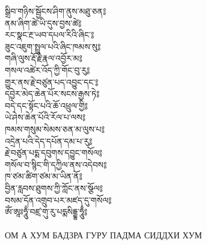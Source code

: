 {སྒྲིབ་གཉིས་སྦྱོངས་ཤིག་ནུས་མཐུ་ཅན༔\\
ནམ་ཞིག་ཚེ་ཡི་དུས་བྱས་ཚེ༔\\
རང་སྣང་རྔ་ཡབ་དཔལ་རིའི་ཞིང་༔\\
ཟུང་འཇུག་སྤྲུལ་པའི་ཞིང་ཁམས་སུ༔\\
གཞི་ལུས་རྡོ་རྗེ་རྣལ་འབྱོར་མ༔\\
གསལ་འཚེར་འོད་ཀྱི་གོང་བུ་རུ༔\\
གྱུར་ནས་རྗེ་བཙུན་པད་འབྱུང་དང་༔\\
དབྱེར་མེད་ཆེན་པོར་སངས་རྒྱས་ཏེ༔\\
བདེ་དང་སྟོང་པའི་ཆོ་འཕྲུལ་གྱི༔\\
ཡེ་ཤེས་ཆེན་པོའི་རོལ་པ་ལས༔\\
ཁམས་གསུམ་སེམས་ཅན་མ་ལུས་པ༔\\
འདྲེན་པའི་དེད་དཔོན་དམ་པ་རུ༔\\
རྗེ་བཙུན་པདྨ་དབུགས་དབྱུང་གསོལ༔\\
གསོལ་བ་སྙིང་གི་དཀྱིལ་ནས་འདེབས༔\\
ཁ་ཙམ་ཚིག་ཙམ་མ་ཡིན་ནོ༔\\
བྱིན་རླབས་ཐུགས་ཀྱི་ཀློང་ནས་སྩོལ༔\\
བསམ་དོན་འགྲུབ་པར་མཛད་དུ་གསོལ༔\\
ཨོཾ་ཨཱཿཧཱུྃ་བཛྲ་གུ་རུ་པདྨསིདྡྷ་ཧཱུྃ༔}\\
\\
\ru ОМ А ХУМ БАДЗРА ГУРУ ПАДМА СИДДХИ ХУМ\\
\\
